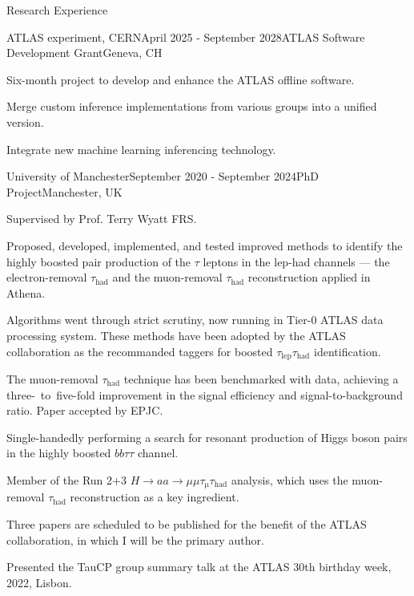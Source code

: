 \documentclass{resume} %
\begin{document}
    \begin{rSection}{Research Experience}
        \begin{rSubsection}{ATLAS experiment, CERN}{April 2025 - September 2028}{ATLAS Software Development Grant}{Geneva, CH}
            \item   Six-month project to develop and enhance the ATLAS offline software.
            \item   Merge custom inference implementations from various groups into a unified version.
            \item   Integrate new machine learning inferencing technology.
        \end{rSubsection}
        \begin{rSubsection}{University of Manchester}{September 2020 - September 2024}{PhD Project}{Manchester, UK}
            \item   Supervised by Prof. Terry Wyatt FRS. 
            \item   Proposed, developed, implemented, and tested improved methods to identify the highly boosted pair production of the $\tau$ leptons in the lep-had channels --- the electron-removal $\tau_\mathrm{had}$ and the muon-removal $\tau_\mathrm{had}$ reconstruction applied in Athena.
            \item   Algorithms went through strict scrutiny, now running in Tier-0 ATLAS data processing system. These methods have been
                adopted by the ATLAS collaboration as the recommanded taggers for boosted $\tau_\mathrm{lep}\tau_\mathrm{had}$ identification.
            \item   The muon-removal $\tau_\mathrm{had}$ technique has been benchmarked with data, achieving a three-~to~five-fold 
                improvement in the signal efficiency and signal-to-background ratio. Paper accepted by EPJC.
            \item   Single-handedly performing a search for resonant production of Higgs boson pairs in the highly boosted $bb\tau\tau$ channel. 
            \item   Member of the Run 2+3 $H\rightarrow aa\rightarrow \mu\mu\tau_\mathrm{\mu}\tau_\mathrm{had}$ analysis, which uses the muon-removal $\tau_\mathrm{had}$ reconstruction as a key ingredient.
            \item   Three papers are scheduled to be published for the benefit of the ATLAS collaboration, in which I will be the primary author.
            \item   Presented the TauCP group summary talk at the ATLAS 30th birthday week, 2022, Lisbon.

\end{rSubsection}
\end{rSection}
\end{document}
